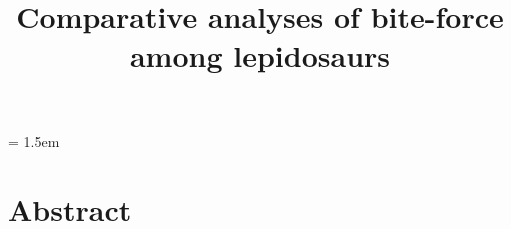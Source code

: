 \documentclass[a4paper, 12pt]{article}
\title{Comparative analyses of bite-force among lepidosaurs}
\author{}
\date{}
\affiliation{}
\begin{document}
\modulolinenumbers[1]   %

\mstitlepage

\parindent = 1.5em
\addtolength{\parskip}{.9em}

\raggedright








\section{Abstract}
\end{document}
